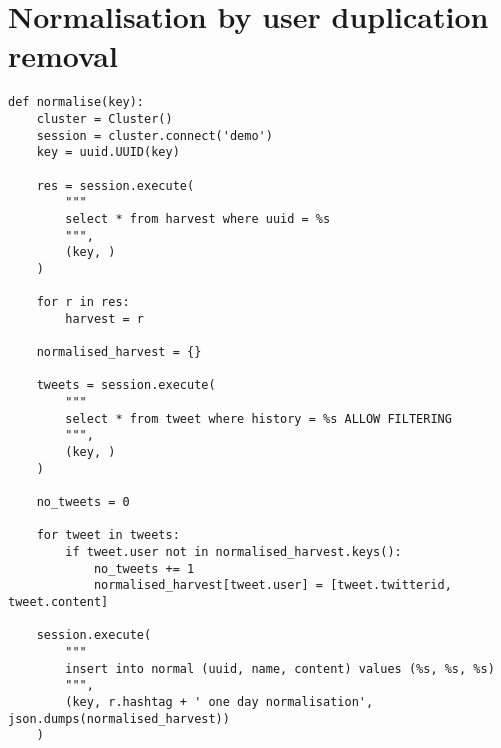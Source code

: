 \section{Normalisation by user duplication removal}
\begin{lstlisting}
def normalise(key):
    cluster = Cluster()
    session = cluster.connect('demo')
    key = uuid.UUID(key)

    res = session.execute(
        """
        select * from harvest where uuid = %s
        """,
        (key, )
    )

    for r in res:
        harvest = r

    normalised_harvest = {}

    tweets = session.execute(
        """
        select * from tweet where history = %s ALLOW FILTERING
        """,
        (key, )
    )

    no_tweets = 0

    for tweet in tweets:
        if tweet.user not in normalised_harvest.keys():
            no_tweets += 1
            normalised_harvest[tweet.user] = [tweet.twitterid, tweet.content]

    session.execute(
        """
        insert into normal (uuid, name, content) values (%s, %s, %s)
        """,
        (key, r.hashtag + ' one day normalisation', json.dumps(normalised_harvest))
    )
\end{lstlisting}
